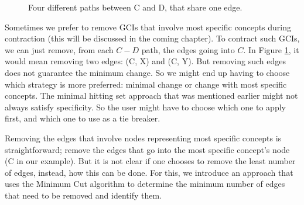 \documentclass{sfuthesis}
\theoremstyle{plain}
\theoremstyle{definition}
\begin{document}
\begin{figure}
\centering
{}
\caption{Four different paths between C and D, that share one edge.}
\label{ex1}
\end{figure}

Sometimes we prefer to remove GCIs that involve most specific concepts during contraction (this will be discussed in the coming chapter). To contract such GCIs, we can just remove, from each $C-D$ path, the edges going into $C$. In Figure \ref{ex1}, it would mean removing two edges: (C, X) and (C, Y). But removing such edges does not guarantee the minimum change. So we might end up having to choose which strategy is more preferred: minimal change or change with most specific concepts. The minimal hitting set approach that was mentioned earlier might not always satisfy specificity. So the user might have to choose which one to apply first, and which one to use as a tie breaker.

Removing the edges that involve nodes representing most specific concepts is straightforward; remove the edges that go into the most specific concept's node (C in our example). But it is not clear if one chooses to remove the least number of edges, instead, how this can be done. For this, we introduce an approach that uses the Minimum Cut algorithm to determine the minimum number of edges that need to be removed and identify them.
\end{document}
